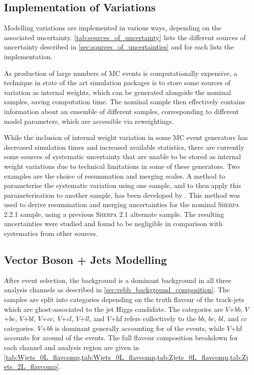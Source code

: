 \subsection{Implementation of Variations}\label{sec:implementation_of_variations}

Modelling variations are implemented in various ways, depending on the associated uncertainty.
\cref{tab:sources_of_uncertainty} lists the different sources of uncertainty described in \cref{sec:sources_of_uncertainties} and for each lists the implementation.



As production of large numbers of MC events is computationally expensive, a technique in state of the art simulation packages is to store some sources of variation as internal weights, which can be generated alongside the nominal samples, saving computation time.
The nominal sample then effectively contains information about an ensemble of different samples, corresponding to different model parameters, which are accessible via reweightings. 

While the inclusion of internal weight variation in some MC event generators has decreased simulation times and increased available statistics, there are currently some sources of systematic uncertainty that are unable to be stored as internal weight variations due to technical limitations in some of these generators.
Two examples are the choice of resummation and merging scales.
A method to parameterise the systematic variation using one sample, and to then apply this parameterisation to another sample, has been developed by \ATLAS \cite{Anders:2125718}.
This method was used to derive resummation and merging uncertainties for the nominal \textsc{Sherpa 2.2.1} sample, using a previous \textsc{Sherpa 2.1} alternate sample.
The resulting uncertainties were studied and found to be negligible in comparison with systematics from other sources.



\subsection{Vector Boson + Jets Modelling}\label{sec:vjets_modelling}

After event selection, the \Vjets background is a dominant background in all three analysis channels as described in \cref{sec:vebb_background_composition}.
The \Vjets samples are split into categories depending on the truth flavour of the track-jets which are ghost-associated to the \largeR jet Higgs candidate.
The categories are $V$+$bb$, $V$+$bc$, $V$+$bl$, $V$+$cc$, $V$+$cl$, $V$+$ll$, and $V$+hf refers collectively to the $bb$, $bc$, $bl$, and $cc$ categories.
$V$+$bb$ is dominant generally accounting for  of the events, while $V$+hf accounts for around  of the events.
The full flavour composition breakdown for each channel and analysis region are given in \cref{tab:Wjets_0L_flavcomp,tab:Wjets_0L_flavcomp,tab:Zjets_0L_flavcomp,tab:Zjets_2L_flavcomp}.

